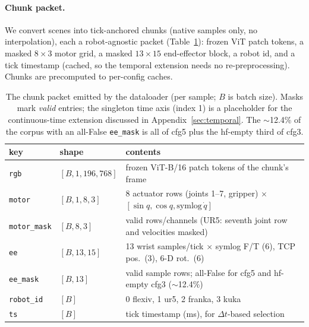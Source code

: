 \documentclass{article}
\begin{document}
\paragraph{Chunk packet.}
We convert scenes into tick-anchored chunks (native samples only, no interpolation), each a robot-agnostic packet (Table~\ref{tab:packet}): frozen ViT patch tokens, a masked $8\times3$ motor grid, a masked $13\times15$ end-effector block, a robot id, and a tick timestamp (cached, so the temporal extension needs no re-preprocessing). Chunks are precomputed to per-config caches.

\begin{table}[!htbp]
  \centering
  \caption{The chunk packet emitted by the dataloader (per sample; $B$ is batch
  size). Masks mark \emph{valid} entries; the singleton time axis (index 1) is a placeholder for the continuous-time extension discussed in Appendix~\ref{sec:temporal}. The $\sim$12.4\% of the corpus with an all-False \texttt{ee\_mask} is all of cfg5 plus the hf-empty third of cfg3.}
  \label{tab:packet}
  \small
  \begin{tabular}{lll}
    \toprule
    key & shape & contents \\
    \midrule
    \texttt{rgb}       & $[B,1,196,768]$ & frozen ViT-B/16 patch tokens of the chunk's frame \\
    \texttt{motor}     & $[B,1,8,3]$     & 8 actuator rows (joints 1--7, gripper) $\times$ $[\sin q,\cos q,\mathrm{symlog}\,\dot q]$ \\
    \texttt{motor\_mask}& $[B,8,3]$      & valid rows/channels (UR5: seventh joint row and velocities masked) \\
    \texttt{ee}        & $[B,13,15]$     & 13 wrist samples/tick $\times$ symlog F/T (6), TCP pos.\ (3), 6-D rot.\ (6) \\
    \texttt{ee\_mask}  & $[B,13]$        & valid sample rows; all-False for cfg5 and hf-empty cfg3 ($\sim$12.4\%) \\
    \texttt{robot\_id} & $[B]$           & 0 flexiv, 1 ur5, 2 franka, 3 kuka \\
    \texttt{ts}        & $[B]$           & tick timestamp (ms), for $\Delta t$-based selection \\
    \bottomrule
  \end{tabular}
\end{table}
\end{document}
